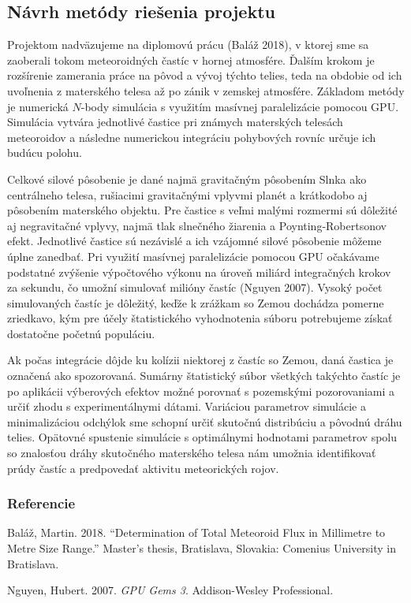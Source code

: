 \subsection{Návrh metódy riešenia
projektu}\label{nuxe1vrh-metuxf3dy-rieux161enia-projektu}

Projektom nadväzujeme na diplomovú prácu (Baláž 2018), v ktorej sme sa
zaoberali tokom meteoroidných častíc v hornej atmosfére. Ďalším krokom
je rozšírenie zamerania práce na pôvod a vývoj týchto telies, teda na
obdobie od ich uvoľnenia z materského telesa až po zánik v zemskej
atmosfére. Základom metódy je numerická \(N\)-body simulácia s využitím
masívnej paralelizácie pomocou GPU. Simulácia vytvára jednotlivé častice
pri známych materských telesách meteoroidov a následne numerickou
integráciu pohybových rovníc určuje ich budúcu polohu.

Celkové silové pôsobenie je dané najmä gravitačným pôsobením Slnka ako
centrálneho telesa, rušiacimi gravitačnými vplyvmi planét a krátkodobo
aj pôsobením materského objektu. Pre častice s veľmi malými rozmermi sú
dôležité aj negravitačné vplyvy, najmä tlak slnečného žiarenia a
Poynting-Robertsonov efekt. Jednotlivé častice sú nezávislé a ich
vzájomné silové pôsobenie môžeme úplne zanedbať. Pri využití masívnej
paralelizácie pomocou GPU očakávame podstatné zvýšenie výpočtového
výkonu na úroveň miliárd integračných krokov za sekundu, čo umožní
simulovať milióny častíc (Nguyen 2007). Vysoký počet simulovaných častíc
je dôležitý, keďže k zrážkam so Zemou dochádza pomerne zriedkavo, kým
pre účely štatistického vyhodnotenia súboru potrebujeme získať
dostatočne početnú populáciu.

Ak počas integrácie dôjde ku kolízii niektorej z častíc so Zemou, daná
častica je označená ako spozorovaná. Sumárny štatistický súbor všetkých
takýchto častíc je po aplikácii výberových efektov možné porovnať s
pozemskými pozorovaniami a určiť zhodu s experimentálnymi dátami.
Variáciou parametrov simulácie a minimalizáciou odchýlok sme schopní
určiť skutočnú distribúciu a pôvodnú dráhu telies. Opätovné spustenie
simulácie s optimálnymi hodnotami parametrov spolu so znalosťou dráhy
skutočného materského telesa nám umožnia identifikovať prúdy častíc a
predpovedať aktivitu meteorických rojov.

\subsubsection*{Referencie}\label{referencie}

\hypertarget{refs}{}
\hypertarget{ref-balaz2018}{}
Baláž, Martin. 2018. ``Determination of Total Meteoroid Flux in
Millimetre to Metre Size Range.'' Master's thesis, Bratislava, Slovakia:
Comenius University in Bratislava.

\hypertarget{ref-nguyen2007}{}
Nguyen, Hubert. 2007. \emph{GPU Gems 3}. Addison-Wesley Professional.
